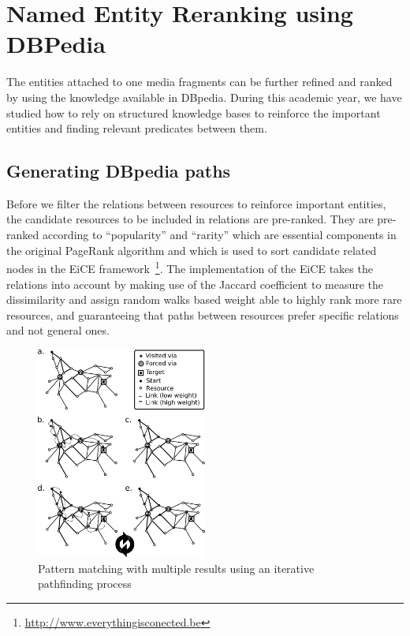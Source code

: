 \documentclass[a4paper,11pt]{report}
\begin{document}
\section{Named Entity Reranking using DBPedia}
The entities attached to one media fragments can be further refined and ranked by using the knowledge available in DBpedia. During this academic year, we have studied how to rely on structured knowledge bases to reinforce the important entities and finding relevant predicates between them.

\subsection{Generating DBpedia paths}
Before we filter the relations between resources to reinforce important entities, the candidate resources to be included in relations are pre-ranked. They are pre-ranked according to ``popularity'' and ``rarity'' which are essential components in the original PageRank algorithm and which is used to sort candidate related nodes in the EiCE framework~\footnote{\url{http://www.everythingisconected.be}}. The implementation of the EiCE takes the relations into account by making use of the Jaccard coefficient to measure the dissimilarity and assign random walks based weight able to highly rank more rare resources, and guaranteeing that paths between resources prefer specific relations and not general ones.

\begin{figure}[htbp!]
\centering
\includegraphics[width=0.5\textwidth]{figure/graphmultipatternmatching.png}
\caption{Pattern matching with multiple results using an iterative pathfinding process}
\label{fig:patternmatching}
\end{figure}
\end{document}
